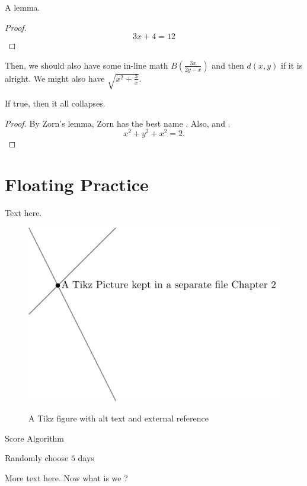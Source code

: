 \begin{lemma}
  A lemma.
\end{lemma}
\begin{proof} ~ %
  \[3x+4=12\]
\end{proof}

Then, we should also have some in-line math $B\left(\frac{3x}{2y-x}\right)$ and then $d(x,y)$ if it is alright. We might also have $\sqrt{x^2+\frac{3}{x}}$.

\begin{theorem}
  If true, then it all collapses.
\end{theorem}
\begin{proof}
  By Zorn's lemma, Zorn has the best name \autocite{martiniCompleteReducedConvex2019}.
  Also, \autocite{chenGraphHomotopyGraham2001} and \autocite{dochtermannMinimalGraphsContractible2023}.
  \[x^2+y^2+x^2=2.\]

\end{proof}
\section{Floating Practice}
Text here.

\begin{figure}\centering
  \includegraphics[alt={two lines intersecting at a point}]{Images/tikzPic.pdf}
  \caption{A Tikz figure with alt text and external reference}
\end{figure}

\begin{algorithm}
  \caption{Score Algorithm}
  \begin{algorithmic}[1]
    \Statex
    \State Randomly choose $5$ days
    \EndFor
    \EndFor
  \end{algorithmic}
\end{algorithm}

More text here. Now what is we ?

\printbibliography[heading=subbibnumbered]

